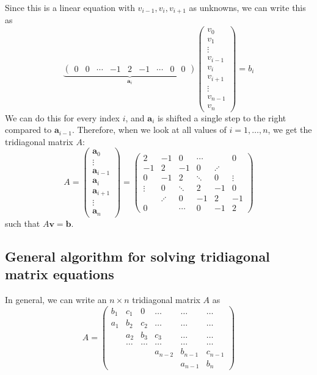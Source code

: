\documentclass[12pt,a4paper]{article}
\newcommand\V[1]{\mathbf{#1}}                  %
\newcommand\M[1]{\begin{pmatrix} #1 \end{pmatrix}} %
\begin{document}
Since this is a linear equation with $v_{i-1},v_i,v_{i+1}$ as unknowns, we can write this as
\begin{equation}
  \underbrace{\M{ 0 & 0 & \cdots & -1 & 2 & -1 & \cdots & 0 & 0 }}_{\V{a}_i}
  \M{ v_0 \\ v_1 \\ \vdots \\ v_{i-1} \\ v_i \\ v_{i+1} \\ \vdots \\ v_{n-1} \\ v_n }
  = b_i
\end{equation}
We can do this for every index $i$, and $\V{a}_i$ is shifted a single step to the right compared to $\V{a}_{i-1}$. Therefore, when we
look at all values of $i = 1, \ldots, n$, we get the tridiagonal matrix $A$:
\begin{equation}
  A = \M{ \V{a}_0 \\ \vdots \\ \V{a}_{i-1} \\ \V{a}_i \\ \V{a}_{i+1} \\ \vdots \\ \V{a}_n }
    = \M{
      2  & -1 & 0 & \cdots &         & 0 \\
      -1 & 2  & -1 & 0 & \iddots & \\
      0 & -1 & 2  & \ddots & 0 & \vdots \\
      \vdots & 0 & \ddots & 2 & -1 & 0\\
        & \iddots & 0 & -1 & 2 & -1 \\
      0 & & \cdots & 0 & -1 & 2
    }
\end{equation}
such that $A \V{v} = \V{b}$.

\subsection{General algorithm for solving tridiagonal matrix equations}
\label{sec:b}

In general, we can write an $n \times n$ tridiagonal matrix $A$ as
\begin{equation}
  A = \M{
    b_1 & c_1 & 0 & \ldots & \ldots & \ldots \\
    a_1 & b_2 & c_2 & \ldots & \ldots & \ldots \\
    & a_2 & b_3 & c_3 & \ldots & \ldots \\
    & \ldots & \ldots & \ldots & \ldots & \ldots \\
    & & & a_{n-2} & b_{n-1} & c_{n-1} \\
    & & & & a_{n-1} & b_n
  }
\end{equation}
\end{document}
